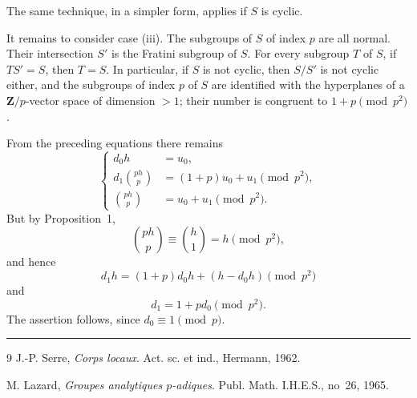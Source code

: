 \documentclass[11pt]{article}
\newcommand{\Z}{\mathbf{Z}}
\begin{document}
The same technique, in a simpler form, applies if \(S\) is cyclic.

It remains to consider case (iii). The subgroups of \(S\) of index \(p\) are
all normal. Their intersection \(S'\) is the Fratini subgroup of \(S\). For
every subgroup \(T\) of \(S\), if \(TS'=S\), then \(T=S\). In particular, if
\(S\) is not cyclic, then \(S/S'\) is not cyclic either, and the subgroups of
index \(p\) of \(S\) are identified with the hyperplanes of a \(\Z/p\)-vector
space of dimension \(>1\); their number is congruent to \(1+p\pmod {p^2}\).

From the preceding equations there remains
\[
\left\{
\begin{aligned}
 d_0h&=u_0,\\
 d_1\binom{ph}{p}&=(1+p)u_0+u_1\pmod {p^2},\\
 \binom{ph}{p}&=u_0+u_1\pmod {p^2}.
\end{aligned}
\right.
\]
But by Proposition~1,
\[
        \binom{ph}{p}\equiv \binom{h}{1}=h\pmod {p^2},
\]
and hence
\[
        d_1h=(1+p)d_0h+(h-d_0h)\pmod {p^2}
\]
and
\[
        d_1=1+pd_0\pmod {p^2}.
\]
The assertion follows, since \(d_0\equiv1\pmod p\).

\begin{center}
\rule{0.25\textwidth}{0.4pt}
\end{center}

\begin{thebibliography}{9}
J.-P. Serre, \emph{Corps locaux}. Act. sc. et ind., Hermann, 1962.

M. Lazard, \emph{Groupes analytiques \(p\)-adiques}. Publ. Math. I.H.E.S.,
no~26, 1965.
\end{thebibliography}
\end{document}
